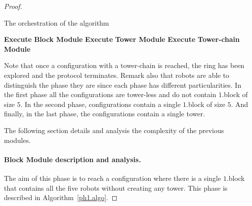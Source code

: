 \documentclass[12pt]{llncs}
\begin{document}
\begin{proof}
{\footnotesize 
\begin{algorithm}[H]
  \caption{The orchestration of the algorithm}
  \label{protocol.algo}
 \begin{algorithmic}[1]
         \State \textbf{Execute} \textbf{Block Module}
      \Else
          \State \textbf{Execute} \textbf{Tower Module} 
       \Else
           \State \textbf{Execute} \textbf{Tower-chain Module} 
     \EndIf
    \EndIf
   \EndIf
  \end{algorithmic}
\end{algorithm}
}
Note that once a configuration with a tower-chain is reached, the ring has been explored and the protocol terminates. Remark also that robots are able to distinguish the phase they are since each phase has different particularities. In the first phase all the configurations are tower-less and do not contain $1$.block of size $5$. 
In the second phase, configurations contain a single $1$.block of size $5$. And finally, in the last phase, the configurations contain a single tower.  

The following section details and analysis the complexity of the previous modules.

\paragraph{Block Module description and analysis.}\label{sec:ph1}

The aim of this phase is to reach a configuration where there is a single $1$.block that contains all the five robots without creating any tower. 
This phase is described in Algorithm~\ref{ph1.algo}.


\end{proof}
\end{document}
